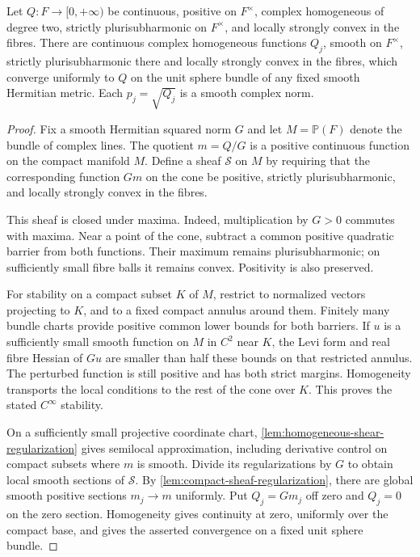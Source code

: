 \begin{theorem}\label{thm:homogeneous-convex-regularization}
Let $Q:F\to[0,+\infty)$ be continuous, positive on $F^\times$, complex homogeneous of degree two, strictly plurisubharmonic on $F^\times$, and locally strongly convex in the fibres. There are continuous complex homogeneous functions $Q_j$, smooth on $F^\times$, strictly plurisubharmonic there and locally strongly convex in the fibres, which converge uniformly to $Q$ on the unit sphere bundle of any fixed smooth Hermitian metric. Each $p_j=\sqrt{Q_j}$ is a smooth complex norm.
\end{theorem}
\begin{proof}
Fix a smooth Hermitian squared norm $G$ and let $M=\mathbb P(F)$ denote the bundle of complex lines. The quotient $m=Q/G$ is a positive continuous function on the compact manifold $M$. Define a sheaf $\mathcal S$ on $M$ by requiring that the corresponding function $Gm$ on the cone be positive, strictly plurisubharmonic, and locally strongly convex in the fibres.

This sheaf is closed under maxima. Indeed, multiplication by $G>0$ commutes with maxima. Near a point of the cone, subtract a common positive quadratic barrier from both functions. Their maximum remains plurisubharmonic; on sufficiently small fibre balls it remains convex. Positivity is also preserved.

For stability on a compact subset $K$ of $M$, restrict to normalized vectors projecting to $K$, and to a fixed compact annulus around them. Finitely many bundle charts provide positive common lower bounds for both barriers. If $u$ is a sufficiently small smooth function on $M$ in $C^2$ near $K$, the Levi form and real fibre Hessian of $Gu$ are smaller than half these bounds on that restricted annulus. The perturbed function is still positive and has both strict margins. Homogeneity transports the local conditions to the rest of the cone over $K$. This proves the stated $C^\infty$ stability.

On a sufficiently small projective coordinate chart, \cref{lem:homogeneous-shear-regularization} gives semilocal approximation, including derivative control on compact subsets where $m$ is smooth. Divide its regularizations by $G$ to obtain local smooth sections of $\mathcal S$. By \cref{lem:compact-sheaf-regularization}, there are global smooth positive sections $m_j\to m$ uniformly. Put $Q_j=Gm_j$ off zero and $Q_j=0$ on the zero section. Homogeneity gives continuity at zero, uniformly over the compact base, and gives the asserted convergence on a fixed unit sphere bundle.


\end{proof}
